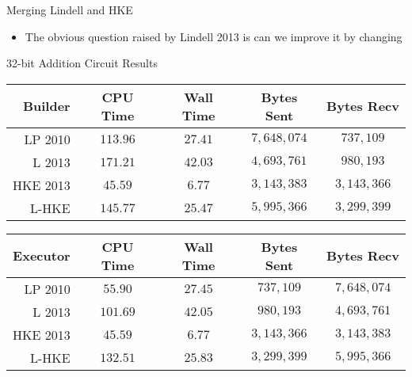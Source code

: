 \documentclass[t, 12pt]{beamer}            %
\begin{document}
\begin{frame}{Merging Lindell and HKE}
	\begin{itemize}[<+->]
		\item The obvious question raised by Lindell 2013 is can we improve it by changing 
	\end{itemize}

\end{frame}


\begin{frame}
	\begin{block}{32-bit Addition Circuit Results}
		\begin{tabular}{| r | c c c c |}
		\hline
		\textbf{Builder} & \textbf{CPU Time} & \textbf{Wall Time} & \textbf{Bytes Sent} & \textbf{Bytes Recv} \\
		\hline
		\hline
		LP 2010 & $113.96$ & $27.41$ & $7,648,074$ & $737,109$ \\
		\hline
		L 2013 & $171.21$ & $42.03$ & $4,693,761$ & $980,193$ \\
		\hline
		HKE 2013 & $45.59$ & $6.77$ & $3,143,383$ & $3,143,366$ \\
		\hline
		L-HKE & $145.77$ & $25.47$ & $5,995,366$ & $3,299,399$ \\
		\hline
		\end{tabular}

		\vspace{0.2cm}

		\begin{tabular}{| r | c c c c |}
		\hline
		\textbf{Executor} & \textbf{CPU Time} & \textbf{Wall Time} & \textbf{Bytes Sent} & \textbf{Bytes Recv} \\
		\hline
		\hline
		LP 2010 & $55.90$ & $27.45$ & $737,109$ & $7,648,074$ \\
		\hline
		L 2013 & $101.69$ & $42.05$ & $980,193$ & $4,693,761$ \\
		\hline
		HKE 2013 & $45.59$ & $6.77$ & $3,143,366$ & $3,143,383$ \\
		\hline
		L-HKE & $132.51$ & $25.83$ & $3,299,399$ & $5,995,366$ \\
		\hline
		\end{tabular}
	\end{block}
\end{frame}
\end{document}
